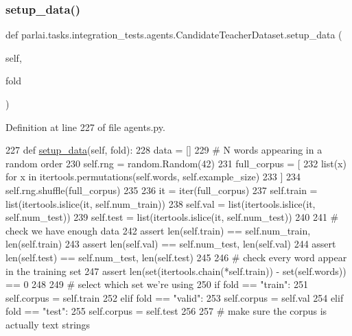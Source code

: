 \subsubsection{\texorpdfstring{setup\+\_\+data()}{setup\_data()}}
{\footnotesize\ttfamily def parlai.\+tasks.\+integration\+\_\+tests.\+agents.\+Candidate\+Teacher\+Dataset.\+setup\+\_\+data (\begin{DoxyParamCaption}\item[{}]{self,  }\item[{}]{fold }\end{DoxyParamCaption})}



Definition at line 227 of file agents.\+py.


\begin{DoxyCode}
227     \textcolor{keyword}{def }\hyperlink{namespaceparlai_1_1tasks_1_1multinli_1_1agents_a4fa2cb0ba1ed745336ad8bceed36b841}{setup\_data}(self, fold):
228         data = []
229         \textcolor{comment}{# N words appearing in a random order}
230         self.rng = random.Random(42)
231         full\_corpus = [
232             list(x) \textcolor{keywordflow}{for} x \textcolor{keywordflow}{in} itertools.permutations(self.words, self.example\_size)
233         ]
234         self.rng.shuffle(full\_corpus)
235 
236         it = iter(full\_corpus)
237         self.train = list(itertools.islice(it, self.num\_train))
238         self.val = list(itertools.islice(it, self.num\_test))
239         self.test = list(itertools.islice(it, self.num\_test))
240 
241         \textcolor{comment}{# check we have enough data}
242         \textcolor{keyword}{assert} len(self.train) == self.num\_train, len(self.train)
243         \textcolor{keyword}{assert} len(self.val) == self.num\_test, len(self.val)
244         \textcolor{keyword}{assert} len(self.test) == self.num\_test, len(self.test)
245 
246         \textcolor{comment}{# check every word appear in the training set}
247         \textcolor{keyword}{assert} len(set(itertools.chain(*self.train)) - set(self.words)) == 0
248 
249         \textcolor{comment}{# select which set we're using}
250         \textcolor{keywordflow}{if} fold == \textcolor{stringliteral}{"train"}:
251             self.corpus = self.train
252         \textcolor{keywordflow}{elif} fold == \textcolor{stringliteral}{"valid"}:
253             self.corpus = self.val
254         \textcolor{keywordflow}{elif} fold == \textcolor{stringliteral}{"test"}:
255             self.corpus = self.test
256 
257         \textcolor{comment}{# make sure the corpus is actually text strings}

\end{DoxyCode}
